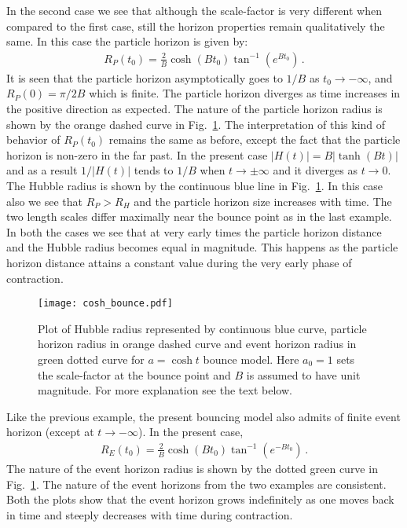 \documentclass[24pt]{article}
\begin{document}
In the second case we see that although the scale-factor is very
different when compared to the first case, still the horizon
properties remain qualitatively the same. In this case the particle
horizon is given by:
\begin{eqnarray}
R_P(t_0) = \frac2B \cosh(Bt_0) \tan^{-1}(e^{B t_0})\,.
\label{case2}
\end{eqnarray}
It is seen that the particle horizon asymptotically goes to $1/B$ as
$t_0 \to -\infty$, and $R_P(0)=\pi/2B$ which is finite. The particle
horizon diverges as time increases in the positive direction as
expected. The nature of the particle horizon radius is shown by the
orange dashed curve in Fig.~\ref{f:acosh}.  The interpretation of this
kind of behavior of $R_P(t_0)$ remains the same as before, except the
fact that the particle horizon is non-zero in the far past. In the
present case $|H(t)|=B |\tanh(Bt)|$ and as a result $1/|H(t)|$ tends
to $1/B$ when $t \to \pm \infty$ and it diverges as $t \to 0$. The
Hubble radius is shown by the continuous blue line in
Fig.~\ref{f:acosh}. In this case also we see that $R_P>R_H$ and the
particle horizon size increases with time.  The two length scales
differ maximally near the bounce point as in the last example. In both
the cases we see that at very early times the particle horizon
distance and the Hubble radius becomes equal in magnitude. This
happens as the particle horizon distance attains a constant value
during the very early phase of contraction.
\begin{figure}[t!]
\centering
\texttt{[image: cosh\_bounce.pdf]}
\caption{Plot of Hubble radius represented by continuous blue curve,
particle horizon radius in orange dashed curve and event horizon
radius in green dotted curve for $a=\cosh t$ bounce model. Here 
$a_0=1$ sets the scale-factor at the bounce point and $B$ is assumed
to have unit magnitude. For more explanation see the text below.}
\label{f:acosh}
\end{figure}

Like the previous example, the present bouncing model also admits of
finite event horizon (except at $t \to -\infty$). In the present case,
\begin{eqnarray}
R_E(t_0) =  \frac{2}{B} \cosh
(Bt_0)\tan^{-1}(e^{-B t_0})\,.
\label{case2e}
\end{eqnarray}
The nature of the event horizon radius is shown by the dotted green
curve in Fig.~\ref{f:acosh}. The nature of the event horizons from the
two examples are consistent. Both the plots show that the event
horizon grows indefinitely as one moves back in time and steeply decreases
with time during contraction. 
\end{document}
